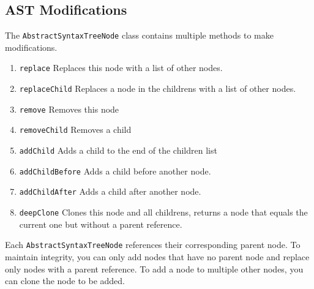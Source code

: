 \subsection{AST Modifications}

The \verb|AbstractSyntaxTreeNode| class contains multiple methods to make modifications.

\begin{enumerate}
\item \verb|replace|  Replaces this node with a list of other nodes.
\item \verb|replaceChild|  Replaces a node in the childrens with a list of other nodes.
\item \verb|remove| Removes this node
\item \verb|removeChild| Removes a child
\item \verb|addChild| Adds a child to the end of the children list
\item \verb|addChildBefore| Adds a child before another node.
\item \verb|addChildAfter| Adds a child after another node.
\item \verb|deepClone| Clones this node and all childrens, returns a node that equals the current one but without a parent reference.
\end{enumerate}

Each \verb|AbstractSyntaxTreeNode| references their corresponding parent node. To maintain integrity, you can only add nodes that have no parent node and replace only nodes with a parent reference. To add a node to multiple other nodes, you can clone the node to be added.
